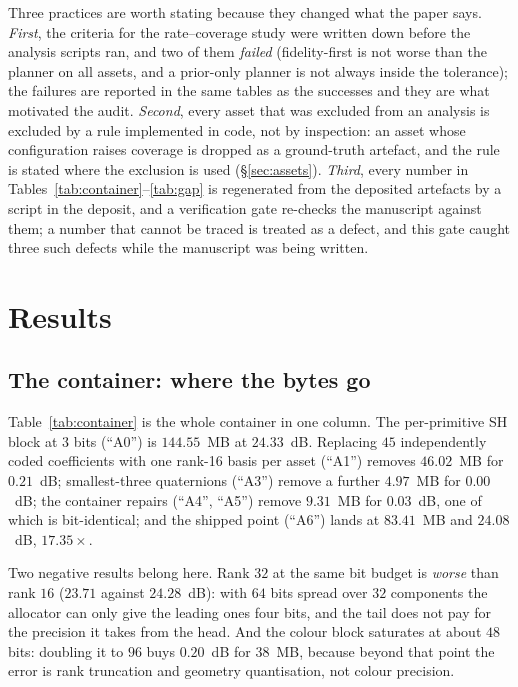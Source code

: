 \documentclass[preprint,number,3p]{elsarticle}
\begin{document}
Three practices are worth stating because they changed what the paper says. \emph{First}, the criteria for the
rate--coverage study were written down before the analysis scripts ran, and two of them \emph{failed}
(fidelity-first is not worse than the planner on all assets, and a prior-only planner is not always inside the
tolerance); the failures are reported in the same tables as the successes and they are what motivated the audit.
\emph{Second}, every asset that was excluded from an analysis is excluded by a rule implemented in code, not by
inspection: an asset whose configuration raises coverage is dropped as a ground-truth artefact, and the rule is
stated where the exclusion is used (\S\ref{sec:assets}). \emph{Third}, every number in
Tables~\ref{tab:container}--\ref{tab:gap} is regenerated from the deposited artefacts by a script in the deposit, and
a verification gate re-checks the manuscript against them; a number that cannot be traced is treated as a defect, and
this gate caught three such defects while the manuscript was being written.

\section{Results}
\label{sec:results}



\subsection{The container: where the bytes go}
\label{sec:res-container}

Table~\ref{tab:container} is the whole container in one column. The per-primitive SH block at $3$ bits
(``A0'') is $144.55$~MB at $24.33$~dB. Replacing $45$ independently coded coefficients with one rank-16 basis per
asset (``A1'') removes $46.02$~MB for $0.21$~dB; smallest-three quaternions (``A3'') remove a further $4.97$~MB for
$0.00$~dB; the container repairs (``A4'', ``A5'') remove $9.31$~MB for $0.03$~dB, one of which is bit-identical; and
the shipped point (``A6'') lands at $83.41$~MB and $24.08$~dB, $17.35\times$.

Two negative results belong here. Rank $32$ at the same bit budget is \emph{worse} than rank $16$ ($23.71$ against
$24.28$~dB): with $64$ bits spread over $32$ components the allocator can only give the leading ones four bits, and
the tail does not pay for the precision it takes from the head. And the colour block saturates at about $48$ bits:
doubling it to $96$ buys $0.20$~dB for $38$~MB, because beyond that point the error is rank truncation and geometry
quantisation, not colour precision.
\end{document}
